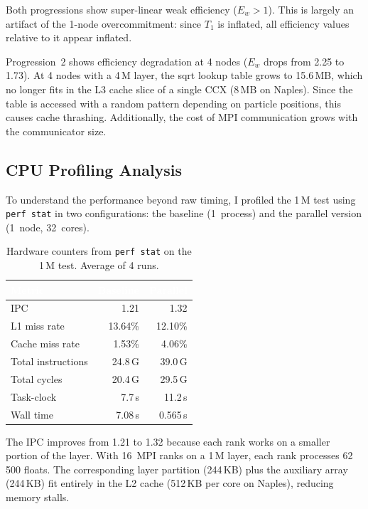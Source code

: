 \documentclass[10pt,dvipsnames,table,twocolumn]{article}
\let\oldtexttt\texttt
\renewcommand{\texttt}[1]{%
  {\small\colorbox{Mist}{\oldtexttt{\textcolor{DarkInk}{#1}}}}%
}
\begin{document}
Both progressions show super-linear weak efficiency ($E_w > 1$). This is largely an artifact of the 1-node overcommitment: since $T_1$ is inflated, all efficiency values relative to it appear inflated.

Progression~2 shows efficiency degradation at 4 nodes ($E_w$ drops from 2.25 to 1.73). At 4 nodes with a 4\,M layer, the sqrt lookup table grows to 15.6\,MB, which no longer fits in the L3 cache slice of a single CCX (8\,MB on Naples). Since the table is accessed with a random pattern depending on particle positions, this causes cache thrashing. Additionally, the cost of MPI communication grows with the communicator size.


\subsection{CPU Profiling Analysis}\label{sec:cpu-prof}

To understand the performance beyond raw timing, I profiled the 1\,M test using \texttt{perf~stat} in two configurations: the baseline (1~process) and the parallel version (1~node, 32~cores).

\begin{table}[t]
\centering
\caption{Hardware counters from \texttt{perf~stat} on the 1\,M test. Average of 4 runs.}\label{tbl:perf}
\small
\begin{tabular}{@{}lrr@{}}
\rowcolor{TableHead}
\textcolor{white}{\textbf{Metric}} &
\textcolor{white}{\textbf{Baseline}} &
\textcolor{white}{\textbf{Parallel}} \\
\midrule
IPC                     & 1.21          & 1.32 \\
\rowcolor{TableRowAlt}
L1 miss rate            & 13.64\%       & 12.10\% \\
Cache miss rate         & 1.53\%        & 4.06\% \\
\rowcolor{TableRowAlt}
Total instructions      & 24.8\,G       & 39.0\,G \\
Total cycles            & 20.4\,G       & 29.5\,G \\
\rowcolor{TableRowAlt}
Task-clock              & 7.7\,s        & 11.2\,s \\
Wall time               & 7.08\,s       & 0.565\,s \\
\bottomrule
\end{tabular}
\end{table}

The IPC improves from 1.21 to 1.32 because each rank works on a smaller portion of the layer. With 16~MPI ranks on a 1\,M layer, each rank processes 62\,500 floats. The corresponding layer partition (244\,KB) plus the auxiliary array (244\,KB) fit entirely in the L2 cache (512\,KB per core on Naples), reducing memory stalls.
\end{document}
